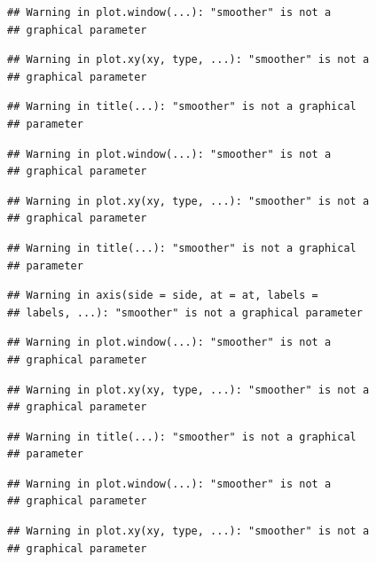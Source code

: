 \documentclass[12pt,]{krantz}
\begin{document}
\begin{verbatim}
## Warning in plot.window(...): "smoother" is not a
## graphical parameter
\end{verbatim}

\begin{verbatim}
## Warning in plot.xy(xy, type, ...): "smoother" is not a
## graphical parameter
\end{verbatim}

\begin{verbatim}
## Warning in title(...): "smoother" is not a graphical
## parameter
\end{verbatim}

\begin{verbatim}
## Warning in plot.window(...): "smoother" is not a
## graphical parameter
\end{verbatim}

\begin{verbatim}
## Warning in plot.xy(xy, type, ...): "smoother" is not a
## graphical parameter
\end{verbatim}

\begin{verbatim}
## Warning in title(...): "smoother" is not a graphical
## parameter
\end{verbatim}

\begin{verbatim}
## Warning in axis(side = side, at = at, labels =
## labels, ...): "smoother" is not a graphical parameter
\end{verbatim}

\begin{verbatim}
## Warning in plot.window(...): "smoother" is not a
## graphical parameter
\end{verbatim}

\begin{verbatim}
## Warning in plot.xy(xy, type, ...): "smoother" is not a
## graphical parameter
\end{verbatim}

\begin{verbatim}
## Warning in title(...): "smoother" is not a graphical
## parameter
\end{verbatim}

\begin{verbatim}
## Warning in plot.window(...): "smoother" is not a
## graphical parameter
\end{verbatim}

\begin{verbatim}
## Warning in plot.xy(xy, type, ...): "smoother" is not a
## graphical parameter
\end{verbatim}
\end{document}
